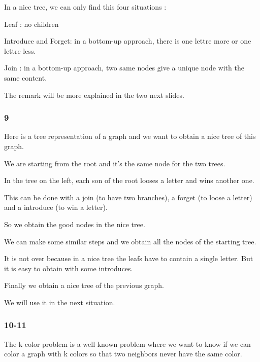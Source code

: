 \documentclass[a4paper, 10pt,french,landscape]{article}
\begin{document}
\begin{multicols}{3}
In a nice tree, we can only find this four situations : 

Leaf : no children

Introduce and Forget: in a bottom-up approach, there is one lettre more or one lettre less.

Join : in a bottom-up approach, two same nodes give a unique node with the same content.

The remark will be more explained in the two next slides. 



\subsubsection*{ 9}

Here is a tree representation of a graph and we want to obtain a nice tree of this graph.


We are starting from the root and it's the same node for the two trees.

In the tree on the left, each son of the root looses a letter and wins another one.

 This can be done with a join (to have two branches), a forget (to loose a letter) and a introduce (to win a letter). 
 
 So we obtain the good nodes in the nice tree.

We can make some similar steps and we obtain all the nodes of the starting tree.

It is not over because in a nice tree the leafs have to contain a single letter. But it is easy  to obtain with some introduces.

Finally we obtain a nice tree of the previous graph. 

We will use it in the next situation.



\subsubsection*{ 10-11}




The k-color problem is a well known problem where we want to know if we can color a graph with k colors so that two neighbors never have the same color.


\end{multicols}
\end{document}
